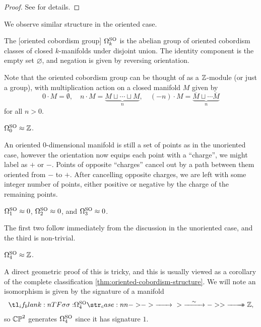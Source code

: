 \begin{remark}
\begin{proof}
	See \cite{dold1956} for details.
\end{proof}

We observe similar structure in the oriented case.

\begin{definition}
	The [oriented cobordism group] $\Omega^{\mathrm{SO}}_k$ is the abelian group of oriented cobordism classes of closed $k$-manifolds
	under disjoint union. The identity component is the empty set $\varnothing$, and negation is given by reversing orientation. 
\end{definition}

Note that the oriented cobordism group can be thought of as a $\mathbb{Z}$-module (or just a group), with multiplication action on a closed manifold $M$ given by
\[
	0\cdot M = \emptyset, \quad n \cdot M = \underbrace{M\sqcup \cdots \sqcup M}_{n}, \quad (-n)\cdot M = \underbrace{\overline{M}\sqcup \cdots \overline{M}}_n
\]
for all $n>0$.

\begin{example}
	$\Omega_0^{\mathrm{SO}} \approx \mathbb{Z}$. 

	An oriented 0-dimensional manifold is still a set of points as in the unoriented case, however the orientation now equips each point with a ``charge'', we might label as $+$ or $-$. Points of opposite ``charges'' cancel out by a path between them oriented from $-$ to $+$. After cancelling opposite charges, we are left with some integer number of points, either positive or negative by the charge of the remaining points.
\end{example}

\begin{example}
	$\Omega_1^{\mathrm{SO}} \approx 0$, $\Omega_2^{\mathrm{SO}} \approx 0$, and $\Omega_3^{\mathrm{SO}} \approx 0$.

	The first two follow immediately from the discussion in the unoriented case, and the third is non-trivial.
\end{example}

\begin{example}
	$\Omega_4^{\mathrm{SO}} \approx \mathbb{Z}$.

	A direct geometric proof of this is tricky, and this is usually viewed as a corollary of the complete classification \cref{thm:oriented-cobordism-structure}. 
	We will note an isomorphism is given by the signature of a manifold
	\begin{equation}\label{eq:signature-cobordism-isomorphism}
		\lkxfunc{\sigma}{\Omega_4^\SO}{\Z,}
	\end{equation}
	so $\mathbb{CP}^2$ generates $\Omega_4^{\mathrm{SO}}$ since it has signature $1$. 
\end{example}


\end{remark}

